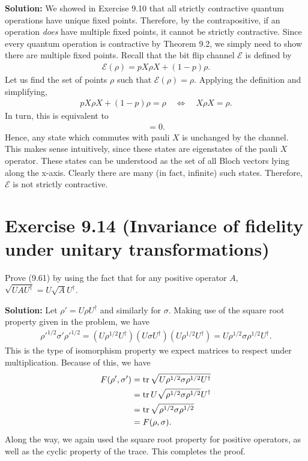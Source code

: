 \documentclass{book}
\newcommand{\mc}[1]{\mathcal{#1}}
\begin{document}
    \textbf{Solution:} We showed in Exercise 9.10 that all strictly contractive quantum operations have unique fixed points. Therefore, by the contrapositive, if an operation \emph{does} have multiple fixed points, it cannot be strictly contractive. Since every quantum operation is contractive by Theorem 9.2, we simply need to show there are multiple fixed points. Recall that the bit flip channel $\mc{E}$ is defined by
    \begin{align}
        \mc{E}(\rho) = p X\rho X + (1-p) \rho.
    \end{align}
    Let us find the set of points $\rho$ such that $\mc{E}(\rho) = \rho$. Applying the definition and simplifying,
    \begin{align}
        p X\rho X +(1-p)\rho = \rho \quad \Leftrightarrow \quad X \rho X = \rho.
    \end{align}
    In turn, this is equivalent to
    \begin{align}
        [\rho, X] = 0.
    \end{align}
    Hence, any state which commutes with pauli $X$ is unchanged by the channel. This makes sense intuitively, since these states are eigenstates of the pauli $X$ operator. These states can be understood as the set of all Bloch vectors lying along the x-axis. Clearly there are many (in fact, infinite) such states. Therefore, $\mc{E}$ is not strictly contractive.
    
\section*{Exercise 9.14 (Invariance of fidelity under unitary transformations)}
    Prove (9.61) by using the fact that for any positive operator $A$, $\sqrt{UAU^\dagger} = U\sqrt{A}U^\dagger$.
    
    \textbf{Solution:} Let $\rho' = U \rho U^\dagger$ and similarly for $\sigma$. Making use of the square root property given in the problem, we have
    \begin{align}
        \rho'^{1/2}\sigma'\rho'^{1/2} = (U\rho^{1/2} U^\dagger) (U \sigma U^\dagger) (U\rho^{1/2}U^\dagger) = U \rho^{1/2}\sigma\rho^{1/2}U^\dagger.
    \end{align}
    This is the type of isomorphism property we expect matrices to respect under multiplication. Because of this, we have
    \begin{align}
    \begin{aligned}
        F(\rho', \sigma') &= \tr\sqrt{U\rho^{1/2}\sigma\rho^{1/2}U^\dagger} \\
        &= \tr U \sqrt{\rho^{1/2}\sigma\rho^{1/2}} U^\dagger \\
        &= \tr \sqrt{\rho^{1/2}\sigma\rho^{1/2}} \\
        &= F(\rho, \sigma).
    \end{aligned}
    \end{align}
    Along the way, we again used the square root property for positive operators, as well as the cyclic property of the trace. This completes the proof.
    
\end{document}
